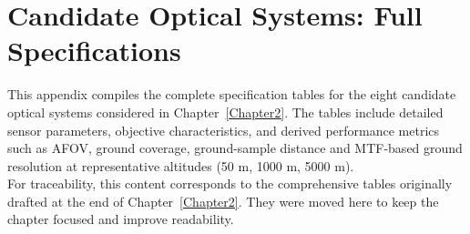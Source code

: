 
\chapter{Candidate Optical Systems: Full Specifications}
\label{ap:sistemas_candidatos}

This appendix compiles the complete specification tables for the eight
candidate optical systems considered in Chapter~\ref{Chapter2}. The tables
include detailed sensor parameters, objective characteristics, and derived
performance metrics such as AFOV, ground coverage, ground-sample distance and
MTF-based ground resolution at representative altitudes (50 m, 1000 m, 5000 m).\\

\noindent For traceability, this content corresponds to the comprehensive tables originally
drafted at the end of Chapter~\ref{Chapter2}. They were moved here to keep the
chapter focused and improve readability.


